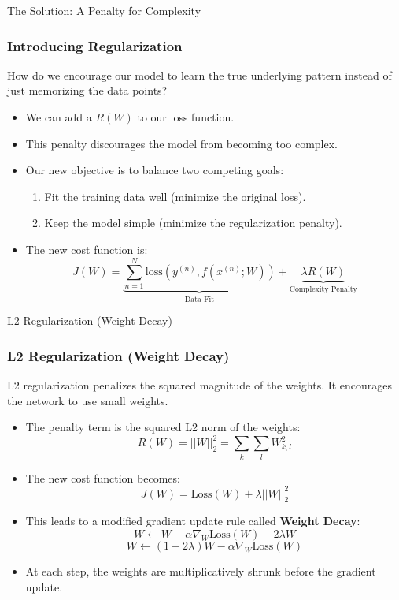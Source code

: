 \begin{frame}{The Solution: A Penalty for Complexity}
    \frametitle{Introducing Regularization}
    How do we encourage our model to learn the true underlying pattern instead of just memorizing the data points?
    \begin{itemize}
        \item We can add a  $R(W)$ to our loss function.
        \item This penalty discourages the model from becoming too complex.
        \item Our new objective is to balance two competing goals:
            \begin{enumerate}
                \item Fit the training data well (minimize the original loss).
                \item Keep the model simple (minimize the regularization penalty).
            \end{enumerate}
        \item The new cost function is:
            $$ J(W) = \underbrace{\sum_{n=1}^{N}\text{loss}(y^{(n)}, f(x^{(n)}; W))}_{\text{Data Fit}} + \underbrace{\lambda R(W)}_{\text{Complexity Penalty}} $$
    \end{itemize}
\end{frame}

\begin{frame}{L2 Regularization (Weight Decay)}
    \frametitle{L2 Regularization (Weight Decay)}
    L2 regularization penalizes the squared magnitude of the weights. It encourages the network to use small weights.
    \begin{itemize}
        \item The penalty term is the squared L2 norm of the weights:
            $$ R(W) = ||W||_2^2 = \sum_k \sum_l W_{k,l}^2 $$
        \item The new cost function becomes:
            $$ J(W) = \text{Loss}(W) + \lambda ||W||_2^2 $$
        \item This leads to a modified gradient update rule called \textbf{Weight Decay}:
            $$ W \leftarrow W - \alpha \nabla_W \text{Loss}(W) - 2\lambda W $$
            $$ W \leftarrow (1 - 2\lambda)W - \alpha \nabla_W \text{Loss}(W) $$
        \item At each step, the weights are multiplicatively shrunk before the gradient update.
    \end{itemize}
\end{frame}

